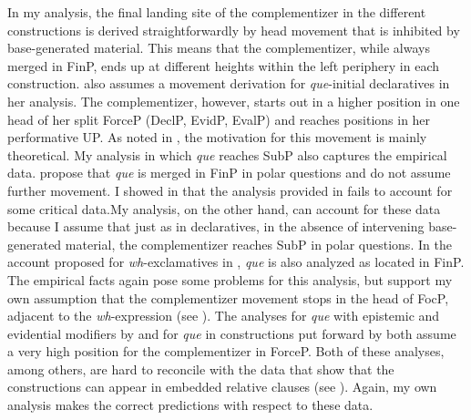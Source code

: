 In my  analysis, the final landing site of the complementizer in the different constructions is derived straightforwardly by  head movement that is inhibited by base-generated material. This means that the complementizer, while always merged in FinP, ends up at different heights within the left periphery in each construction. \citet{Corr2016} also assumes a movement derivation for  \emph{que}-initial declaratives  in her analysis. The complementizer, however, starts out in a  higher position in one head of her split ForceP (DeclP, EvidP, EvalP) and reaches positions in her performative UP. As noted in , the motivation for this movement is mainly theoretical. My analysis in which \emph{que} reaches  SubP also captures the empirical data.  \citet{PrietoRigau2007}  propose that \emph{que} is merged in FinP in polar questions and do not assume further movement. I showed in  that the analysis provided in \citet{PrietoRigau2007} fails to account for  some critical data.\largerpage[1] My analysis, on the other hand, can account for these data because I assume that  just as in declaratives, in the absence of intervening base-generated material,  the complementizer reaches SubP in polar questions. In the account proposed for \textit{wh}-exclamatives in \citet{DemonteSoriano2009}, \emph{que} is also analyzed as located in FinP. The empirical facts again pose some problems for this analysis, but support my own assumption that the complementizer movement stops in the head of FocP, adjacent to the \textit{wh}-expression (see ). The analyses  for \emph{que} with epistemic and evidential  modifiers  by \citet{Cruschina2018}  and for \emph{que} in  constructions put forward by \citet{Hernanz2007} both assume a very high position for the complementizer in ForceP. Both of these analyses, among others, are hard to reconcile  with the data that show that the constructions can appear in embedded relative clauses (see ). Again, my own analysis makes the correct predictions with respect to these data.

